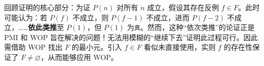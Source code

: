 回顾证明的核心部分：为证 $P(n)$ 对所有 $n$ 成立，假设其存在反例 $f \in F$。此时可能认为：若 $P(f)$ 不成立，则 $P(f-1)$ 不成立，进而 $P(f-2)$ 不成立，……\textbf{依此类推}至 $P(1)$，但 $P(1)$ 为\verb|真|。然而，这种``依次类推''的论证正是 PMI 和 WOP 旨在解决的问题！无法用模糊的``继续下去''证明此过程可行。因此需借助 WOP 找出 $F$ 的最小元。引入 $f \in F$ 看似未直接使用，实则 $f$ 的存在性保证了 $F \ne \varnothing$，从而能够应用 WOP。

\clearpage
